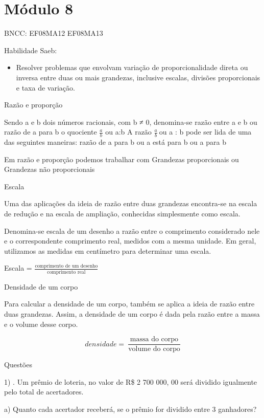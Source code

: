 \hypertarget{muxf3dulo-8}{%
\section{Módulo 8}\label{muxf3dulo-8}}

BNCC: EF08MA12 EF08MA13

Habilidade Saeb:

\begin{itemize}
\tightlist
\item
  Resolver problemas que envolvam variação de proporcionalidade direta
  ou inversa entre duas ou mais grandezas, inclusive escalas, divisões
  proporcionais e taxa de variação.
\end{itemize}

Razão e proporção

Sendo a e b dois números racionais, com b ≠ 0, denomina-se razão entre a
e b ou razão de a para b o quociente \(\frac{a}{b}\) ou a:b A razão
\(\frac{a}{b}\ \)ou a : b pode ser lida de uma das seguintes maneiras:
razão de a para b ou a está para b ou a para b

Em razão e proporção podemos trabalhar com Grandezas proporcionais ou
Grandezas não proporcionais

Escala

Uma das aplicações da ideia de razão entre duas grandezas encontra-se na
escala de redução e na escala de ampliação, conhecidas simplesmente como
escala.

Denomina-se escala de um desenho a razão entre o comprimento considerado
nele e o correspondente comprimento real, medidos com a mesma unidade.
Em geral, utilizamos as medidas em centímetro para determinar uma
escala.

Escala =
\(\frac{\text{comprimento\ de\ um\ desenho}}{\text{comprimento\ real}}\)

Densidade de um corpo

Para calcular a densidade de um corpo, também se aplica a ideia de razão
entre duas grandezas. Assim, a densidade de um corpo é dada pela razão
entre a massa e o volume desse corpo.

\[densidade = \ \frac{\text{massa\ do\ corpo}}{\text{volume\ do\ corpo}}\]

Questões

1) . Um prêmio de loteria, no valor de R\$ 2 700 000, 00 será dividido
igualmente pelo total de acertadores.

a) Quanto cada acertador receberá, se o prêmio for dividido entre 3
ganhadores?

